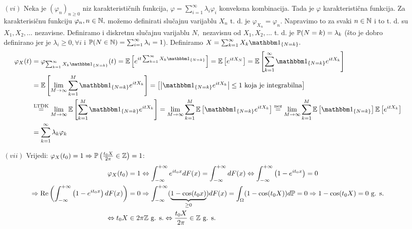 \documentclass{article}
\newcommand{\myre}{\operatorname{Re}}
\begin{document}
\begin{enumerate}
    \item[\((vi)\)] Neka je \((\varphi_n)_{n\ge0}\) niz karakterističnih funkcija, \(\varphi=\sum_{i=1}^\infty\lambda_i\varphi_i\) konveksna kombinacija. Tada je \(\varphi\) karakteristična funkcija. Za karakterisičnu funkciju \(\varphi_n,n\in\Bbb N,\) možemo definirati slučajnu varijablu \(X_n\) t. d. je \(\varphi_{X_n}=\varphi_n.\) Napravimo to za svaki \(n\in\Bbb N\) i to t. d. su \(X_1,X_2,\ldots\) nezavisne. Definiramo i diskretnu slučajnu varijablu \(N,\) nezavisnu od \(X_1,X_2,\ldots\) t. d. je \(\Bbb P(N=k)=\lambda_k\) (što je dobro definirano jer je \(\lambda_i\ge0,\forall i\) i \(\Bbb P(N\in\Bbb N)=\sum_{i=1}^\infty\lambda_i=1\)). Definiramo \(X=\sum_{k=1}^\infty X_k\mathbbm 1_{\{N=k\}}.\) \[\begin{aligned}\varphi_X(t)&=\varphi_{\sum_{k=1}^\infty X_k\mathbbm 1_{\{N=k\}}}(t)=\Bbb E\left[e^{it\sum_{k=1}^\infty X_k\mathbbm 1_{\{N=k\}}}\right]=\Bbb E\left[e^{it X_N}\right]=\Bbb E\left[\sum_{k=1}^\infty\mathbbm 1_{\{N=k\}}e^{itX_k}\right]\\&=\Bbb E\left[\lim_{M\to\infty}\sum_{k=1}^M\mathbbm 1_{\{N=k\}}e^{itX_k}\right]=\begin{bmatrix}\left|\mathbbm 1_{\{N=k\}}e^{itX_k}\right|\le 1\text{ koja je 
 integrabilna}\end{bmatrix}\\&\overset{\text{LTDK}}{=}\lim_{M\to\infty}\Bbb E\left[\sum_{k=1}^M\mathbbm 1_{\{N=k\}}e^{itX_k}\right]=\lim_{M\to\infty}\sum_{k=1}^M\Bbb E\left[\mathbbm 1_{\{N=k\}}e^{itX_k}\right]\overset{\text{nez}}{=}\lim_{M\to\infty}\sum_{k=1}^M\Bbb E\left[\mathbbm 1_{\{N=k\}}\right]\Bbb E\left[e^{itX_k}\right]\\&=\sum_{k=1}^\infty\lambda_k\varphi_k\end{aligned}\]
    \item[\((vii)\)] Vrijedi: \(\varphi_X(t_0)=1\Rightarrow\Bbb P\left(\frac{t_0X}{2\pi}\in\Bbb Z\right)=1\): \[\begin{aligned}\varphi_X(t_0)&=1\Leftrightarrow\int_{-\infty}^{+\infty}e^{it_0x}dF(x)=\int_{-\infty}^{+\infty}dF(x)\Leftrightarrow\int_{-\infty}^{+\infty}\left(1-e^{it_0x}\right)=0\\\Rightarrow\myre\left(\int_{-\infty}^{+\infty}\left(1-e^{it_0x}\right)dF(x)\right)&=0\Rightarrow\int_{-\infty}^{+\infty}(\underbrace{1-\cos(t_0x)}_{\ge0})dF(x)=\int_\Omega(1-\cos(t_0X))d\Bbb P=0\Rightarrow1-\cos(t_0X)=0\text{ g. s.}\\\Leftrightarrow t_0X&\in2\pi\Bbb Z\text{ g. s.}\Leftrightarrow \frac{t_0X}{2\pi}\in\Bbb Z\text{ g. s.}\end{aligned}\]

\end{enumerate}
\end{document}
